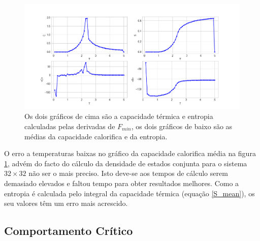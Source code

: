 \documentclass[12pt, a4paper]{article}
\begin{document}
	\begin{figure}[h]
		\centering
		\includegraphics[scale=0.5]{C_S_L32.png}
		\caption{Os dois gráficos de cima são a capacidade térmica e entropia calculadas pelas derivadas de $F_{min}$, os dois gráficos de baixo são as médias da capacidade calorifica e da entropia.}
		\label{C_S_L32}
	\end{figure}
	
	O erro a temperaturas baixas no gráfico da capacidade calorifica média na figura \ref{C_S_L32}, advém do facto do cálculo da densidade de estados conjunta para o sistema $32 \times 32$ não ser o mais preciso. Isto deve-se aos tempos de cálculo serem demasiado elevados e faltou tempo para obter resultados melhores. Como a entropia é calculada pelo integral da capacidade térmica (equação \ref{S_mean}), os seu valores têm um erro mais acrescido.
	
	
	\subsection{Comportamento Crítico}
	
\end{document}
